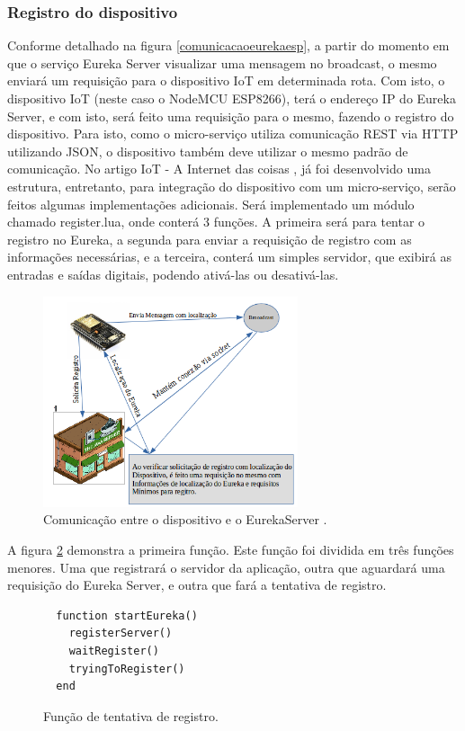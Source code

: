 \documentclass[journal]{IEEEtran}
\begin{document}
\subsubsection{Registro do dispositivo}

Conforme detalhado na figura \ref{comunicacaoeurekaesp}, a partir do momento em que o serviço Eureka Server visualizar uma mensagem no broadcast, o mesmo enviará um requisição para o dispositivo IoT em determinada rota. Com isto, o dispositivo IoT (neste caso o NodeMCU ESP8266), terá o endereço IP do Eureka Server, e com isto, será feito uma requisição para o mesmo, fazendo o registro do dispositivo. Para isto, como o micro-serviço utiliza comunicação REST via HTTP utilizando JSON, o dispositivo também deve utilizar o mesmo padrão de comunicação. No artigo IoT - A Internet das coisas \cite{freiregebaraiot}, já foi desenvolvido uma estrutura, entretanto, para integração do dispositivo com um micro-serviço, serão feitos algumas implementações adicionais. Será implementado um módulo chamado register.lua, onde conterá 3 funções. A primeira será para tentar o registro no Eureka, a segunda para enviar a requisição de registro com as informações necessárias, e a terceira, conterá um simples servidor, que exibirá as entradas e saídas digitais, podendo ativá-las ou desativá-las. 

\begin{figure}[h]
\centering
\includegraphics[height=6.2cm]{comunicacao}
\caption{Comunicação entre o dispositivo e o EurekaServer \cite{imagemjavaserver}.}
\label{fig:hystrix-container}
\end{figure}

A figura \ref{functtentregistroeureka} demonstra a primeira função. Este função foi dividida em três funções menores. Uma que registrará o servidor da aplicação, outra que aguardará uma requisição do Eureka Server, e  outra que fará a tentativa de registro.

\begin{figure}[H]
\centering

\begin{lstlisting}
  function startEureka()
    registerServer()
    waitRegister()
    tryingToRegister()
  end
\end{lstlisting}
\caption{Função de tentativa de registro.}
\label{functtentregistroeureka}
\end{figure}
  
\end{document}

